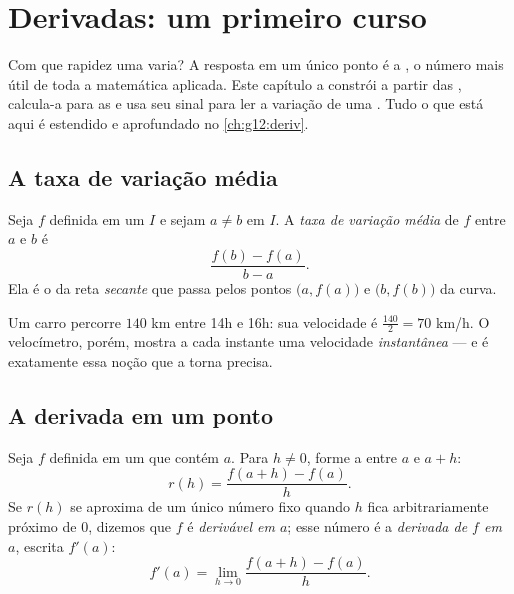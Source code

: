 \chapter{Derivadas: um primeiro curso}\label{ch:g11:deriv}

Com que rapidez uma  varia? A resposta em um único ponto é a
\emph{}, o número mais útil de toda a matemática aplicada. Este
capítulo a constrói a partir das , calcula-a para
as  e usa seu sinal para ler a variação de uma
. Tudo o que está aqui é estendido e aprofundado no
\cref{ch:g12:deriv}.

\section{A taxa de variação média}

\begin{definition}\label{def:g11:deriv:rate}
Seja $f$ definida em um  $I$ e sejam $a \neq b$ em $I$. A
\emph{taxa de variação média} de $f$ entre
$a$ e $b$ é
\[
\frac{f(b) - f(a)}{b - a}.
\]
Ela é o  da reta \emph{secante} que
passa pelos pontos $\bigl(a, f(a)\bigr)$ e $\bigl(b, f(b)\bigr)$ da
curva.
\end{definition}

\begin{example}
Um carro percorre $140$ km entre 14h e 16h: sua velocidade  é
$\frac{140}{2} = 70$ km/h. O velocímetro, porém, mostra a cada instante
uma velocidade \emph{instantânea} --- e é exatamente essa noção que a
 torna precisa.
\end{example}

\section{A derivada em um ponto}

\begin{definition}\label{def:g11:deriv:derivative}
Seja $f$ definida em um  que contém $a$. Para $h \neq 0$, forme
a  entre $a$ e $a + h$:
\[
r(h) = \frac{f(a+h) - f(a)}{h}.
\]
Se $r(h)$ se aproxima de um único número fixo quando $h$ fica
arbitrariamente próximo de $0$, dizemos que $f$ é \emph{derivável em
$a$}; esse número é a \emph{derivada de
$f$ em $a$}, escrita $f'(a)$:
\[
f'(a) = \lim_{h \to 0} \frac{f(a+h) - f(a)}{h}.
\]
\end{definition}

